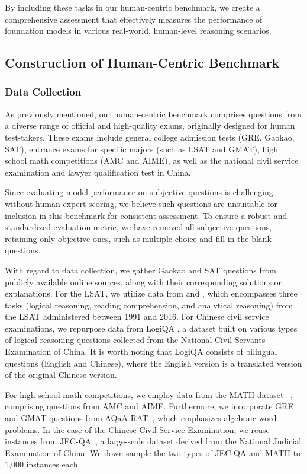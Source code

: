By including these tasks in our human-centric benchmark, we create a comprehensive assessment that effectively measures the performance of foundation models in various real-world, human-level reasoning scenarios.
\subsection{Construction of Human-Centric Benchmark}
\subsubsection{Data Collection} As previously mentioned, our human-centric benchmark comprises questions from a diverse range of official and high-quality exams, originally designed for human test-takers. These exams include general college admission tests (GRE, Gaokao, SAT), entrance exams for specific majors (such as LSAT and GMAT), high school math competitions (AMC and AIME), as well as the national civil service examination and lawyer qualification test in China.

Since evaluating model performance on subjective questions is challenging without human expert scoring, we believe such questions are unsuitable for inclusion in this benchmark for consistent assessment. To ensure a robust and standardized evaluation metric, we have removed all subjective questions, retaining only objective ones, such as multiple-choice and fill-in-the-blank questions. 

With regard to data collection, we gather Gaokao and SAT questions from publicly available online sources, along with their corresponding solutions or explanations. For the LSAT, we utilize data from \citet{wang2022lsat} and \citet{zhong-etal-2022-analytical}, which encompasses three tasks (logical reasoning, reading comprehension, and analytical reasoning) from the LSAT administered between 1991 and 2016. For Chinese civil service examinations, we repurpose data from LogiQA \citep{liu2021logiqa}, a dataset built on various types of logical reasoning questions collected from the National Civil Servants Examination of China. It is worth noting that LogiQA consists of bilingual questions (English and Chinese), where the English version is a translated version of the original Chinese version.

For high school math competitions, we employ data from the MATH dataset~ \citep{hendrycks2measuring}, comprising questions from AMC and AIME. Furthermore, we incorporate GRE and GMAT questions from AQaA-RAT~\citep{ling2017program}, which emphasizes algebraic word problems. In the case of the Chinese Civil Service Examination, we reuse instances from JEC-QA~\citep{zhong2019jec}, a large-scale dataset derived from the National Judicial Examination of China. We down-sample the two types of JEC-QA and MATH to 1,000 instances each. 

